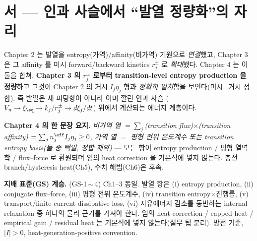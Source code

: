 
\section*{서 — 인과 사슬에서 ``발열 정량화''의 자리}
Chapter 2 는 발열을 entropy(가역)/affinity(비가역) 기원으로 \emph{연결}했고, Chapter 3 은 그 affinity 를
미시 forward/backward kinetics $r_j^\pm$ 로 \emph{확대}했다. Chapter 4 는 이 둘을 합쳐, \textbf{Chapter 3 의
$r_j^\pm$ 로부터 transition-level entropy production 을 정량}하고 그것이 Chapter 2 의 거시 $I_j\eta_j$ 형과
\emph{정확히 일치}함을 보인다(미시=거시 정합). 즉 발열은 새 피팅항이 아니라 이미 깔린 인과 사슬
($V_n\to\xi_{\eq}\to k_j/r_j^\pm\to d\xi_j/dt$) 위에서 계산되는 에너지 계층이다.

\textbf{Chapter 4 의 한 문장 요지.} \emph{비가역 열 $=\sum_j$(transition flux)$\times$(transition affinity)
$=\sum_j n_j^{\eff}I_j\eta_j\ge0$, 가역 열 $=$ 평형 전위 온도계수 또는 transition entropy basis(둘 중 택일,
정합 제약)} — 모든 항이 entropy production / 평형 열역학 / flux--force 로 환원되며 임의 heat correction 을
기본식에 넣지 않는다. 충전 branch/hysteresis heat(Ch5), 수치 해법(Ch6)은 후속.

\begin{groundingbox}
\textbf{지배 표준(GS) 계승.} (GS-1\,$\sim$\,4) Ch1--3 동일. 발열 항은 (i) entropy production, (ii) conjugate
flux--force, (iii) 평형 전위 온도계수, (iv) transition entropy$\times$진행률, (v) transport/finite-current
dissipative loss, (vi) 자유에너지 감소를 동반하는 internal relaxation 중 하나의 물리 근거를 가져야 한다.
임의 heat correction / capped heat / empirical gain / residual heat 는 기본식에 넣지 않는다(실무 팁 분리).
방전 기준, $|I|>0$, heat-generation-positive convention.
\end{groundingbox}


